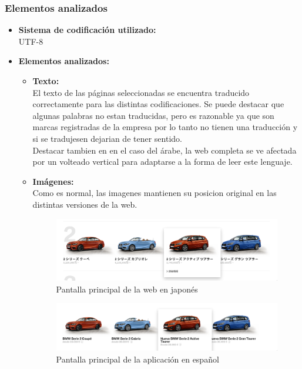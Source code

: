 \documentclass[a4paper,11pt]{article}
\begin{document}
\subsubsection{Elementos analizados}
\begin{itemize}
\item \textbf{Sistema de codificación utilizado:}\\
UTF-8
\item \textbf{Elementos analizados:}\\
\begin{itemize}
  \item \textbf{Texto:}\\
  El texto de las páginas seleccionadas se encuentra traducido correctamente para las distintas codificaciones. Se puede destacar que algunas palabras no estan traducidas, pero es razonable ya que son marcas registradas de la empresa por lo tanto no tienen una traducción y si se tradujesen dejarian de tener sentido.\\
  Destacar tambien en en el caso del árabe, la web completa se ve afectada por un volteado vertical para adaptarse a la forma de leer este lenguaje.

  \item \textbf{Imágenes:}\\
  Como es normal, las imagenes mantienen su posicion original en las distintas versiones de la web.

  \begin{figure}[H]
    \centering
    \includegraphics[scale=0.35]{imjp.png}
    \caption{Pantalla principal de la web en japonés}
    \label{fig:imagenesjp}
  \end{figure}
  \begin{figure}[H]
    \centering
    \includegraphics[scale=0.35]{imsp.png}
    \caption{Pantalla principal de la aplicación en español}
    \label{fig:imagenessp}
  \end{figure}



\end{itemize}
\end{itemize}
\end{document}

